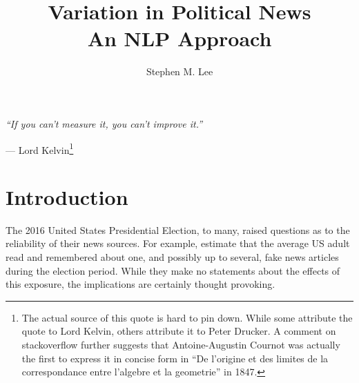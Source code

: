 \documentclass{article}
\author{Stephen M. Lee}
\title{Variation in Political News \\ \large{An NLP Approach}}
\begin{document}
	
	\maketitle 
	
	\newpage
	
		
	\newpage
	
	\tableofcontents
	
	\newpage
	
	
	\vspace{2\baselineskip}
	\begin{center}
		\textit{``If you can't measure it, you can't improve it.''}
	\end{center}
	\begin{flushright}
		--- Lord Kelvin\footnote{The actual source of this quote is hard to pin down. While some attribute the quote to Lord Kelvin, others attribute it to Peter Drucker. A comment on stackoverflow further suggests that Antoine-Augustin Cournot was actually the first to express it in concise form in ``De l'origine et des limites de la correspondance entre l'algebre et la geometrie'' in 1847.}
	\end{flushright}

	\vspace{2\baselineskip}
	
	\section{Introduction}
	
		The 2016 United States Presidential Election, to many, raised questions as to the reliability of their news sources. For example, \citet{allcott2017social} estimate that the average US adult read and remembered about one, and possibly up to several, fake news articles during the election period. While they make no statements about the effects of this exposure, the implications are certainly thought provoking. 
		
\end{document}
